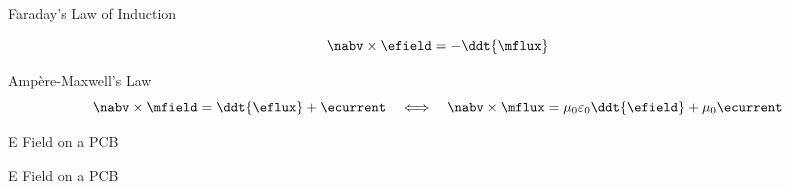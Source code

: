 \begin{frame}{Faraday's Law of Induction}
    \begin{twocolumns}[0.35]
    \leftcol
        \vspace{-10pt}
        \begin{equation}
            \nabv \times \efield = -\ddt{\mflux}
        \end{equation}
    \rightcol
 \end{twocolumns}

\end{frame}

\begin{frame}{Ampère-Maxwell's Law}
    \vspace{-10pt}
    \begin{equation}
        \nabv \times \mfield = \ddt{\eflux} + \ecurrent
        \hspace{1em} \Longleftrightarrow \hspace{1.0em}
        \nabv \times \mflux = \mu_0 \varepsilon_0 \ddt{\efield} + \mu_0 \ecurrent
    \end{equation}
\end{frame}

\begin{frame}{E Field on a PCB}
    \vspace{-20pt}
\end{frame}

\begin{frame}{E Field on a PCB}
    \vspace{-20pt}
\end{frame}

